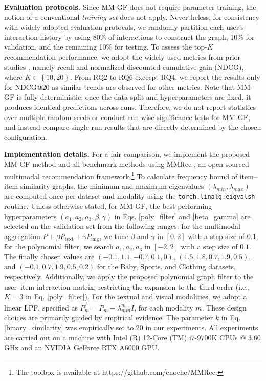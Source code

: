 \documentclass[a4paper,fleqn]{cas-sc}
\renewcommand{\cite}{\citep}
\begin{document}
\noindent\textbf{Evaluation protocols.} Since \textsf{MM-GF} does not require parameter training, the notion of a conventional {\it training set} does not apply. Nevertheless, for consistency with widely adopted evaluation protocols, we randomly partition each user’s interaction history by using 80\% of interactions to construct the graph, 10\% for validation, and the remaining 10\% for testing. To assess the top-$K$ recommendation performance, we adopt the widely used metrics from prior studies \cite{DBLP:conf/sigir/0001DWLZ020, DBLP:conf/aaai/HeM16, DBLP:conf/mm/WeiWN0C20, DBLP:conf/mm/Zhang00WWW21, DBLP:conf/www/ZhouZLZMWYJ23, DBLP:conf/mm/ZhouS23, DBLP:conf/mm/Yu0LB23, DBLP:conf/cikm/ShenWZSZLL21, DBLP:conf/sigir/ParkSS24}, namely recall and normalized discounted cumulative gain (NDCG), where $K \in \left\{ {10,20} \right\} $. From RQ2 to RQ6 excecpt RQ4, we report the results only for NDCG@$20$ as similar trends are observed for other metrics. Note that \textsf{MM-GF} is fully deterministic; once the data split and hyperparameters are fixed, it produces identical predictions across runs. Therefore, we do not report statistics over multiple random seeds or conduct run-wise significance tests for \textsf{MM-GF}, and instead compare single-run results that are directly determined by the chosen configuration.

\noindent\textbf{Implementation details.} For a fair comparison, we implement the proposed \textsf{MM-GF} method and all benchmark methods using MMRec \cite{DBLP:conf/mmasia/Zhou23}, an open-sourced multimodal recommendation framework.\footnote{The toolbox is available at https://github.com/enoche/MMRec.} To calculate frequency bound of item--item similarity graphs, the minimum and maximum eigenvalues $(\lambda_{min}, \lambda_{max})$ are computed once per dataset and modality using the \texttt{torch.linalg.eigvalsh} routine. Unless otherwise stated, for \textsf{MM-GF}, the best-performing hyperparameters $(a_1, a_2, a_3, \beta, \gamma)$ in Eqs. \eqref{poly_filter} and \eqref{beta_gamma} are selected on the validation set from the following ranges: for the multimodal aggregation $P + \beta P_{\text{text}} + \gamma P_{\text{img}}$, we tune $\beta$ and $\gamma$ in $[0, 2]$ with a step size of $0.1$; for the polynomial filter, we search $a_1, a_2, a_3$ in $[-2, 2]$ with a step size of $0.1$. The finally chosen values are $(-0.1, 1.1, -0.7, 0.1, 0)$, $(1.5, 1.8, 0.7, 1.9, 0.5)$, and $(-0.1, 0.7, 1.9, 0.5, 0.2)$ for the Baby, Sports, and Clothing datasets, respectively. Additionally, we apply the proposed polynomial graph filter to the user--item interaction matrix, restricting the expansion to the third order (i.e., $K=3$ in Eq. \eqref{poly_filter}). For the textual and visual modalities, we adopt a linear LPF, specified as $\bar P_m^f = \bar P_m-\lambda_{min}^mI$, for each modality $m$. These design choices are primarily guided by empirical evidence. The parameter $k$ in Eq. \eqref{binary_similarity} was empirically set to 20 in our experiments. All experiments are carried out on a machine with Intel (R) 12-Core (TM) i7-9700K CPUs @ 3.60 GHz and an NVIDIA GeForce RTX A6000 GPU.
\end{document}
